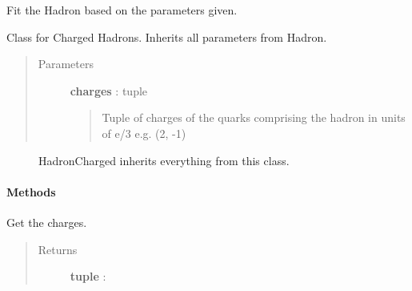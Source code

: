 \documentclass[letterpaper,10pt,english]{sphinxmanual}
\begin{document}
\begin{fulllineitems}
\begin{fulllineitems}
\label{index:pyontdd.lib.hadron.Hadron.fit}
Fit the Hadron based on the parameters given.

\end{fulllineitems}


\end{fulllineitems}


\begin{fulllineitems}
\label{index:pyontdd.lib.hadron.HadronCharged}
Class for Charged Hadrons. Inherits all parameters from Hadron.
\begin{quote}\begin{description}
\item[{Parameters }] \leavevmode
\textbf{charges} : tuple
\begin{quote}

Tuple of charges of the quarks comprising the hadron in units of e/3 e.g. (2, -1)
\end{quote}

\end{description}\end{quote}



\begin{description}
\item[{{\hyperref[index:pyontdd.lib.hadron.Hadron]{}}}] \leavevmode
HadronCharged inherits everything from this class.

\end{description}


\paragraph{Methods}

\begin{fulllineitems}
\label{index:pyontdd.lib.hadron.HadronCharged.get_charges}
Get the charges.
\begin{quote}\begin{description}
\item[{Returns }] \leavevmode
\textbf{tuple} :
\begin{quote}


\end{quote}
\end{description}
\end{quote}
\end{fulllineitems}
\end{fulllineitems}
\end{document}
